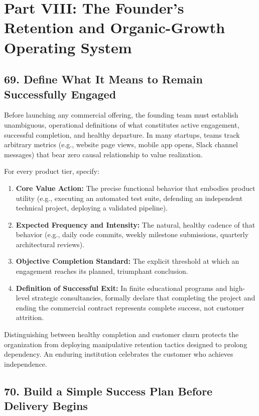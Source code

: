 \section*{Part VIII: The Founder's Retention and Organic-Growth Operating System}

\subsection*{69. Define What It Means to Remain Successfully Engaged}

Before launching any commercial offering, the founding team must establish unambiguous, operational definitions of what constitutes active engagement, successful completion, and healthy departure. In many startups, teams track arbitrary metrics (e.g., website page views, mobile app opens, Slack channel messages) that bear zero causal relationship to value realization.

For every product tier, specify:
\begin{enumerate}[leftmargin=*]
\item \textbf{Core Value Action:} The precise functional behavior that embodies product utility (e.g., executing an automated test suite, defending an independent technical project, deploying a validated pipeline).
\item \textbf{Expected Frequency and Intensity:} The natural, healthy cadence of that behavior (e.g., daily code commits, weekly milestone submissions, quarterly architectural reviews).
\item \textbf{Objective Completion Standard:} The explicit threshold at which an engagement reaches its planned, triumphant conclusion.
\item \textbf{Definition of Successful Exit:} In finite educational programs and high-level strategic consultancies, formally declare that completing the project and ending the commercial contract represents complete success, not customer attrition.
\end{enumerate}

Distinguishing between healthy completion and customer churn protects the organization from deploying manipulative retention tactics designed to prolong dependency. An enduring institution celebrates the customer who achieves independence.

\subsection*{70. Build a Simple Success Plan Before Delivery Begins}

